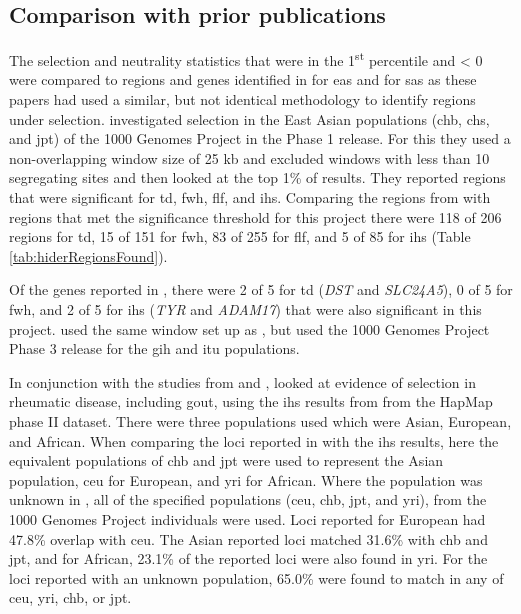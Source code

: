 \documentclass[twoside,openright]{report}
\begin{document}
\subsection{Comparison with prior publications}\label{priorPubs}

The selection and neutrality statistics that were in the
1\textsuperscript{st} percentile and \textless{} 0 were compared to
regions and genes identified in \citet{Hider2013} for \gls{eas} and
\citet{Jonnalagadda2017} for \gls{sas} as these papers had used a
similar, but not identical methodology to identify regions under
selection. \citet{Hider2013} investigated selection in the East Asian
populations (\gls{chb}, \gls{chs}, and \gls{jpt}) of the 1000 Genomes
Project in the Phase 1 release. For this they used a non-overlapping
window size of 25 kb and excluded windows with less than 10 segregating
sites and then looked at the top 1\% of results. They reported regions
that were significant for \gls{td}, \gls{fwh}, \gls{flf}, and \gls{ihs}.
Comparing the regions from \citet{Hider2013} with regions that met the
significance threshold for this project there were 118 of 206 regions
for \gls{td}, 15 of 151 for \gls{fwh}, 83 of 255 for \gls{flf}, and 5 of
85 for \gls{ihs} (Table \ref{tab:hiderRegionsFound}).

Of the genes reported in \citet{Jonnalagadda2017}, there were 2 of 5 for
\gls{td} (\emph{DST} and \emph{SLC24A5}), 0 of 5 for \gls{fwh}, and 2 of
5 for \gls{ihs} (\emph{TYR} and \emph{ADAM17}) that were also
significant in this project. \citet{Jonnalagadda2017} used the same
window set up as \citet{Hider2013}, but used the 1000 Genomes Project
Phase 3 release for the \gls{gih} and \gls{itu} populations.

In conjunction with the studies from \citet{Hider2013} and
\citet{Jonnalagadda2017}, \citet{Ramos2017} looked at evidence of
selection in rheumatic disease, including gout, using the \gls{ihs}
results from \citet{voight2006map} from the HapMap phase II dataset.
There were three populations used which were Asian, European, and
African. When comparing the loci reported in \citet{Ramos2017} with the
\gls{ihs} results, here the equivalent populations of \gls{chb} and
\gls{jpt} were used to represent the Asian population, \gls{ceu} for
European, and \gls{yri} for African. Where the population was unknown in
\citet{Ramos2017}, all of the specified populations (\gls{ceu},
\gls{chb}, \gls{jpt}, and \gls{yri}), from the 1000 Genomes Project
individuals were used. Loci reported for European had 47.8\% overlap
with \gls{ceu}. The Asian reported loci matched 31.6\% with \gls{chb}
and \gls{jpt}, and for African, 23.1\% of the reported loci were also
found in \gls{yri}. For the loci reported with an unknown population,
65.0\% were found to match in any of \gls{ceu}, \gls{yri}, \gls{chb}, or
\gls{jpt}.
\end{document}
